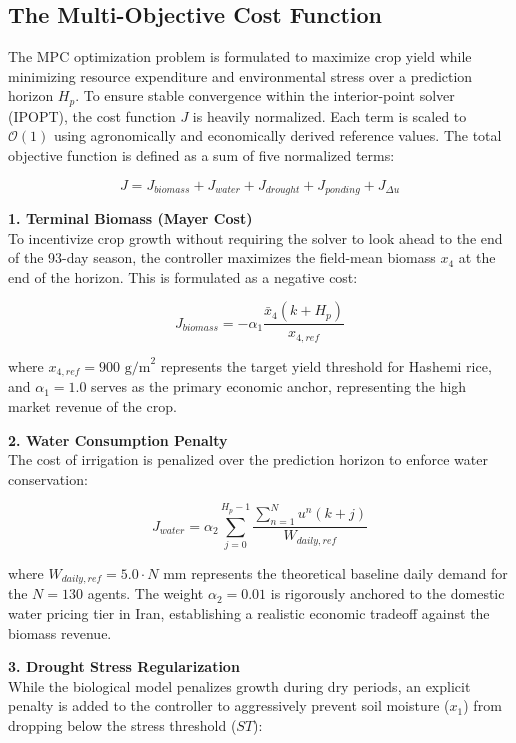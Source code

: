 \documentclass[11pt, a4paper]{article}
\begin{document}
\subsection{The Multi-Objective Cost Function}
The MPC optimization problem is formulated to maximize crop yield while minimizing resource expenditure and environmental stress over a prediction horizon $H_p$. To ensure stable convergence within the interior-point solver (IPOPT), the cost function $J$ is heavily normalized. Each term is scaled to $\mathcal{O}(1)$ using agronomically and economically derived reference values. The total objective function is defined as a sum of five normalized terms:

\begin{equation}
    J = J_{biomass} + J_{water} + J_{drought} + J_{ponding} + J_{\Delta u}
\end{equation}

\textbf{1. Terminal Biomass (Mayer Cost)} \\
To incentivize crop growth without requiring the solver to look ahead to the end of the 93-day season, the controller maximizes the field-mean biomass $x_4$ at the end of the horizon. This is formulated as a negative cost:

\begin{equation}
    J_{biomass} = -\alpha_1 \frac{\bar{x}_4(k+H_p)}{x_{4,ref}}
\end{equation}

where $x_{4,ref} = 900 \text{ g/m}^2$ represents the target yield threshold for Hashemi rice, and $\alpha_1 = 1.0$ serves as the primary economic anchor, representing the high market revenue of the crop.

\textbf{2. Water Consumption Penalty} \\
The cost of irrigation is penalized over the prediction horizon to enforce water conservation:

\begin{equation}
    J_{water} = \alpha_2 \sum_{j=0}^{H_p-1} \frac{\sum_{n=1}^{N} u^n(k+j)}{W_{daily,ref}}
\end{equation}

where $W_{daily,ref} = 5.0 \cdot N$ mm represents the theoretical baseline daily demand for the $N=130$ agents. The weight $\alpha_2 = 0.01$ is rigorously anchored to the domestic water pricing tier in Iran, establishing a realistic economic tradeoff against the biomass revenue.

\textbf{3. Drought Stress Regularization} \\
While the biological model penalizes growth during dry periods, an explicit penalty is added to the controller to aggressively prevent soil moisture ($x_1$) from dropping below the stress threshold ($ST$):
\end{document}
